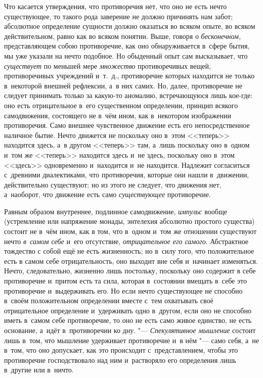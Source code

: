 Что касается утверждения, что противоречия нет, что оно не есть нечто
существующее, то такого рода заверение не должно причинять нам забот;
абсолютное определение сущности должно оказаться во всяком опыте, во всяком
действительном, равно как во всяком понятии. Выше, говоря о
{\em бесконечном,} представляющем собою противоречие,
как оно обнаруживается в~сфере бытия, мы уже указали на нечто подобное. Но
обыденный опыт сам высказывает, что {\em существует} по
меньшей мере {\em множество} противоречивых вещей,
противоречивых учреждений и~т.~д., противоречие которых находится не только
в~некоторой внешней рефлексии, а~в них самих. Но, далее, противоречие не
следует принимать только за какую-то аномалию, встречающуюся лишь кое-где:
оно есть отрицательное в~его существенном определении, принцип всякого
самодвижения, состоящего не в~чём ином, как в~некотором изображении
противоречия. Само внешнее чувственное движение есть его непосредственное
наличное бытие. Нечто движется не поскольку оно в~этом <<теперь>> находится
здесь, а~в другом <<теперь>> там, а~лишь поскольку оно в~одном и~том же
<<теперь>> находится здесь и~не здесь, поскольку оно в~этом <<здесь>>
одновременно и~находится и~не находится. Надлежит согласиться с~древними
диалектиками, что противоречия, которые они нашли в~движении, действительно
существуют; но из этого не следует, что движения нет, а~наоборот, что
движение есть само {\em существующее} противоречие.

Равным образом внутреннее, подлинное самодвижение,
{\em импульс} вообще (устремление или напряжение
монады, энтелехия абсолютно простого существа) состоит не в~чём ином, как в
том, что в~одном и~том же отношении существуют нечто
{\em в~самом себе} и~его отсутствие,
{\em отрицательное его самого}. Абстрактное тождество с
собой ещё не есть жизненность; но в~силу того, что положительное есть в
самом себе отрицательность, оно выходит вне себя и~начинает изменяться.
Нечто, следовательно, жизненно лишь постольку, поскольку оно содержит в
себе противоречие и~притом есть та сила, которая в~состоянии вмещать в~себе
это противоречие и~выдерживать его. Но если нечто существующее не способно
в~своём положительном определении вместе с~тем охватывать своё
отрицательное определение и~удерживать одно в~другом, если оно не способно
иметь в~самом себе противоречие, то оно не есть само живое единство, не
есть основание, а~идёт в~противоречии ко дну. "---
{\em Спекулятивное мышление} состоит лишь в~том, что
мышление удерживает противоречие и~в нём "--- само себя, а~не в~том, что оно
допускает, как это происходит с~представлением, чтобы это противоречие
господствовало над ним и~растворяло его определения лишь в~другие или в~ничто.

